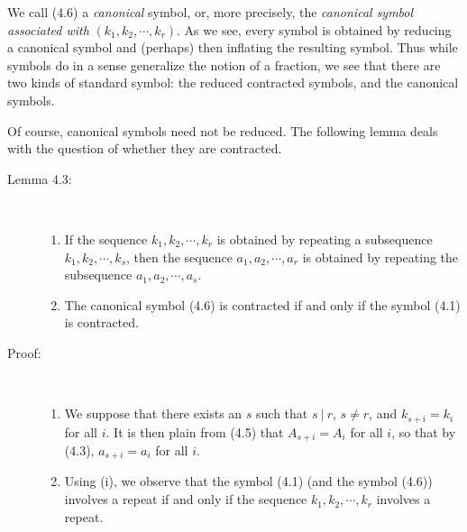 We call (4.6) a \emph{canonical} symbol, or, more precisely, the \emph{canonical symbol associated with} $(k_{1}, k_{2}, \cdots, k_{r})$. As we see, every symbol is obtained by reducing a canonical symbol and (perhaps) then inflating the resulting symbol. Thus while symbols do in a sense generalize the notion of a fraction, we see that there are two kinds of standard symbol: the reduced contracted symbols, and the canonical symbols.

Of course, canonical symbols need not be reduced. The following lemma deals with the question of whether they are contracted.

\begin{description}

  \item[Lemma 4.3:] $\ $
    \begin{enumerate}[\hspace{1cm}(i)]
      \item If the sequence $k_{1}, k_{2}, \cdots, k_{r}$ is obtained by repeating a subsequence $k_{1}, k_{2}, \cdots, k_{s}$, then the sequence $a_{1}, a_{2}, \cdots, a_{r}$ is obtained by repeating the subsequence $a_{1}, a_{2}, \cdots, a_{s}$.
      \item The canonical symbol (4.6) is contracted if and only if the symbol (4.1) is contracted.
    \end{enumerate}

  \item[Proof:] $\ $
    \begin{enumerate}[\hspace{1cm}(i)]
      \item We suppose that there exists an $s$ such that $s\ |\ r$, $s \neq r$, and $k_{s+i} = k_{i}$ for all $i$. It is then plain from (4.5) that $A_{s+i} = A_{i}$ for all $i$, so that by (4.3), $a_{s+i} = a_{i}$ for all $i$.
      \item Using (i), we observe that the symbol (4.1) (and the symbol (4.6)) involves a repeat if and only if the sequence $k_{1}, k_{2}, \cdots, k_{r}$ involves a repeat.
    \end{enumerate}


\end{description}
